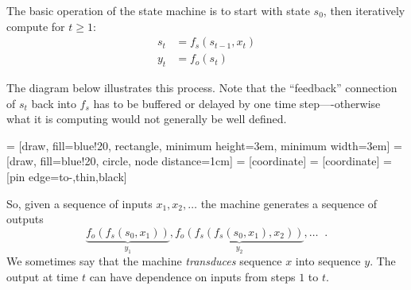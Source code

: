 The basic operation of the state machine is to   start with
state $s_0$, then iteratively compute for $t \geq 1$:
\begin{align}
  s_t & = f_s(s_{t - 1}, x_t) \\
  y_t & =  f_o(s_t)
\end{align}
\begin{examplebox}
  The diagram below illustrates this process.  Note that the
  ``feedback'' connection of $s_t$ back into $f_s$ has to be buffered or
  delayed by one time step----otherwise what it is computing would not
  generally be well defined.
  \begin{center}
     = [draw, fill=blue!20, rectangle, minimum height=3em, minimum width=3em]
     = [draw, fill=blue!20, circle, node distance=1cm]
     = [coordinate]
     = [coordinate]
     = [pin edge={to-,thin,black}]

  \end{center}
\end{examplebox}
So, given a sequence of inputs $x_1, x_2, \dots$ the machine generates a
sequence of outputs
$$ \underbrace{f_o(f_s(s_0, x_1))}_{y_1}, \underbrace{f_o(f_s(f_s(s_0, x_1), x_2
    ))}_{y_2}, \dots \;\;.$$
We sometimes say that the machine {\em  transduces} sequence  $x$ into
sequence $y$.
The output at time $t$ can have dependence on inputs from steps $1$ to
$t$.

